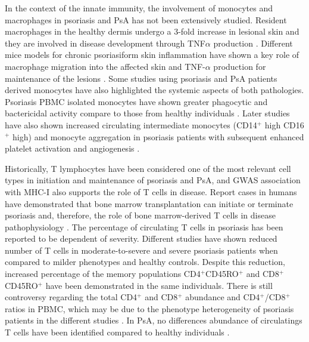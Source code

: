 {In the context of the innate immunity, the involvement of monocytes and macrophages in psoriasis and PsA has not been extensively studied. Resident macrophages in the healthy dermis undergo a 3-fold increase in lesional skin and they are involved in disease development through TNF$\alpha$ production \parencite{Perera2012, Mahil2016}. Different mice models for chronic psoriasiform skin inflammation have shown a key role of macrophage migration into the affected skin and TNF-$\alpha$ production for maintenance of the lesions \parencite{Stratis2006, Wang2006}. Some studies using psoriasis and PsA patients derived monocytes have also highlighted the systemic aspects of both pathologies. Psoriasis PBMC isolated monocytes have shown greater phagocytic and bactericidal activity compare to those from healthy individuals \parencite{Bar-Eli1979}. Later studies have also shown increased circulating intermediate monocytes (CD14$^{+}$ high CD16$^{+}$ high) and monocyte aggregation in psoriasis patients with subsequent enhanced platelet activation and angiogenesis \parencite {Golden2015}. %

Historically, T lymphocytes have been considered one of the most relevant cell types in initiation and maintenance of psoriasis and PsA, and GWAS association with MHC-I also supports the role of T cells in disease. Report cases in humans have demonstrated that bone marrow transplantation can initiate or terminate psoriasis and, therefore, the role of bone marrow-derived T cells in disease pathophysiology \parencite{Eedy1990, Gardembas1990}. The percentage of circulating T cells in psoriasis has been reported to be dependent of severity. Different studies have shown reduced number of T cells in moderate-to-severe and severe psoriasis patients when compared to milder phenotypes and healthy controls. Despite this reduction, increased percentage of the memory populations CD4$^{+}$CD45RO$^{+}$ and CD8$^{+}$CD45RO$^{+}$ have been demonstrated in the same individuals\parencite{Lecewicz-Toruń2001,Langewouters2008}. There is still controversy regarding the total CD4$^+$ and CD8$^{+}$ abundance and CD4$^{+}$/CD8$^{+}$ ratios in PBMC, which may be due to the phenotype heterogeneity of psoriasis patients in the different studies \parencite{Lecewicz-Toruń2001,Cameron2003,Langewouters2008}. In PsA, no differences  abundance of circulatings T cells have been identified compared to healthy individuals \parencite{Costello1999}.

}

